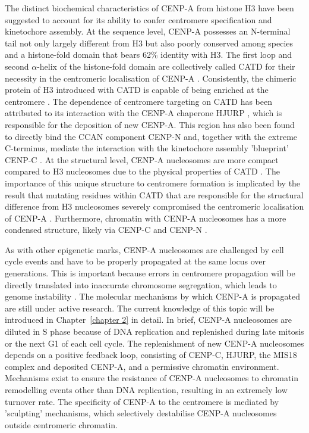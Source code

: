 The distinct biochemical characteristics of CENP-A from histone H3 have been suggested to account for its ability to confer centromere specification and kinetochore assembly. At the sequence level, CENP-A possesses an N-terminal tail not only largely different from H3 \citep{Sullivan1994HumanCentromere.} but also poorly conserved among species \citep{Goutte-Gattat2013PhosphorylationFunction} and a histone-fold domain that bears 62\% identity with H3. The first loop and second $\alpha$-helix of the histone-fold domain are collectively called CATD for their necessity in the centromeric localisation of CENP-A \citep{Black2007}. Consistently, the chimeric protein of H3 introduced with CATD is capable of being enriched at the centromere \citep{Black2007a}. The dependence of centromere targeting on CATD has been attributed to its interaction with the CENP-A chaperone HJURP \citep{Zhou2011StructuralScm3, Bassett2012, Hu2011StructureHJURP, Shuaib2010HJURPCentromeres}, which is responsible for the deposition of new CENP-A. This region has also been found to directly bind the CCAN component CENP-N \citep{Logsdon2015, Carroll2010, Carroll2009} and, together with the extreme C-terminus, mediate the interaction with the kinetochore assembly 'blueprint' CENP-C \citep{Carroll2010, Kato2013Spt6H3, Guse2011, Walstein2021}. At the structural level, CENP-A nucleosomes are more compact compared to H3 nucleosomes due to the physical properties of CATD \citep{Black2004, Sekulic2010}. The importance of this unique structure to centromere formation is implicated by the result that mutating residues within CATD that are responsible for the structural difference from H3 nucleosomes severely compromised the centromeric localisation of CENP-A \citep{Sekulic2010}. Furthermore, chromatin with CENP-A nucleosomes has a more condensed structure, likely via CENP-C and CENP-N \citep{Panchenko2011, Geiss2014, Zhou2022}. 

As with other epigenetic marks, CENP-A nucleosomes are challenged by cell cycle events and have to be properly propagated at the same locus over generations. This is important because errors in centromere propagation will be directly translated into inaccurate chromosome segregation, which leads to genome instability \citep{McClintock1939TheMeiosis, Koshland1987ACerevisiae}. The molecular mechanisms by which CENP-A is propagated are still under active research. The current knowledge of this topic will be introduced in Chapter~\ref{chapter 2} in detail. In brief, CENP-A nucleosomes are diluted in S phase because of DNA replication and replenished during late mitosis or the next G1 of each cell cycle. The replenishment of new CENP-A nucleosomes depends on a positive feedback loop, consisting of CENP-C, HJURP, the MIS18 complex and deposited CENP-A, and a permissive chromatin environment. Mechanisms exist to ensure the resistance of CENP-A nucleosomes to chromatin remodelling events other than DNA replication, resulting in an extremely low turnover rate. The specificity of CENP-A to the centromere is mediated by 'sculpting' mechanisms, which selectively destabilise CENP-A nucleosomes outside centromeric chromatin. 


